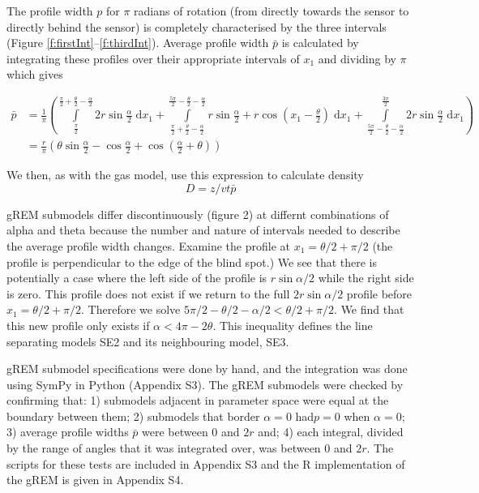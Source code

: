 \documentclass[a4paper,10pt,reqno,oneside]{amsart}
\begin{document}
The profile width $p$ for $\pi$ radians of rotation (from directly towards the sensor to directly behind the sensor) is completely characterised by the three intervals (Figure \ref{f:firstInt}--\ref{f:thirdInt}). Average profile width $\bar{p}$ is calculated by integrating these profiles over their appropriate intervals of $x_1$ and dividing by $\pi$ which gives

\begin{align}
    \bar{p} &=\frac{1}{\pi} \left(\int\limits_{\frac{\pi}{2}}^{\frac{\pi}{2} + \frac{\theta}{2} - \frac{\alpha}{2}}2 r \sin{\frac{\alpha}{2} }\;\mathrm{d}x_1+\int\limits_{\frac{\pi}{2} + \frac{\theta}{2} - \frac{\alpha}{2}}^{\frac{5 \pi}{2} - \frac{\theta}{2} - \frac{\alpha}{2}}r \sin{\frac{\alpha}{2} } + r \cos{\left (x_1 - \frac{\theta}{2} \right )}\;\mathrm{d}x_1+\int\limits_{\frac{5 \pi}{2} - \frac{\theta}{2} - \frac{\alpha}{2}}^{\frac{3 \pi}{2}}2 r \sin{\frac{\alpha}{2} }\;\mathrm{d}x_1\right) \nonumber  \\
     &= \frac{r}{\pi} \left(\theta \sin{\frac{\alpha}{2} } - \cos{\frac{\alpha}{2} } + \cos{\left (\frac{\alpha}{2} + \theta \right )}\right) \label{e:p321}
\end{align}

We then, as with the gas model, use this expression to calculate density
\begin{equation}
\label{e:gas}
D = z/vt\bar{p}
\end{equation}


gREM submodels differ discontinuously (figure 2) at differnt combinations of alpha and theta because the number and nature of intervals needed to describe the average profile width changes.  
Examine the profile at $x_1 = 	\theta/2 + \pi/2$ (the profile is perpendicular to the edge of the blind spot.) We see that there is potentially a case where the left side of the profile is $r\sin \alpha/2$ while the right side is zero. This profile does not exist if we return to the full $2r\sin \alpha/2$ profile before $x_1  = \theta/2 + \pi/2$. Therefore we solve $5\pi/2 - \theta/2 - \alpha/2 <  \theta/2 + \pi/2$. We find that this new profile only exists if $ \alpha < 4\pi - 2 \theta$. This inequality defines the line separating models SE2 and its neighbouring model, SE3.

gREM submodel specifications were done by hand, and the integration was done using SymPy \citep{sympy} in Python (Appendix S3). The gREM submodels were checked by confirming that: 1) submodels adjacent in parameter space were equal at the boundary between them; 2) submodels that border $ \alpha = 0$ had$p = 0$ when $ \alpha = 0$; 3) average profile widths $\bar{p}$ were between 0 and $2r$ and; 4) each integral, divided by the range of angles that it was integrated over, was between 0 and $2r$. The scripts for these tests are included in Appendix S3 and the R \citep{R} implementation of the gREM is given in Appendix S4.  
\end{document}
